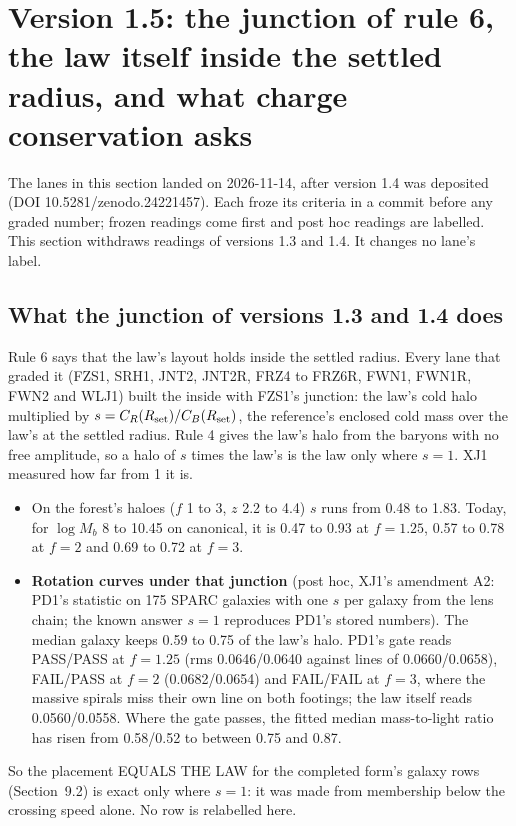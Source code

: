 \documentclass[10pt]{article}
\begin{document}
\section{Version 1.5: the junction of rule 6, the law itself inside the settled radius, and what charge conservation asks}
The lanes in this section landed on 2026-11-14, after version 1.4 was deposited (DOI 10.5281/zenodo.24221457). Each froze its criteria in a commit before any graded number; frozen readings come first and post hoc readings are labelled. This section withdraws readings of versions 1.3 and 1.4. It changes no lane's label.

\subsection{What the junction of versions 1.3 and 1.4 does}
Rule 6 says that the law's layout holds inside the settled radius. Every lane that graded it (FZS1, SRH1, JNT2, JNT2R, FRZ4 to FRZ6R, FWN1, FWN1R, FWN2 and WLJ1) built the inside with FZS1's junction: the law's cold halo multiplied by $s=C_R(R_{\rm set})/C_B(R_{\rm set})$, the reference's enclosed cold mass over the law's at the settled radius. Rule 4 gives the law's halo from the baryons with no free amplitude, so a halo of $s$ times the law's is the law only where $s=1$. XJ1 measured how far from 1 it is.
\begin{itemize}
\item On the forest's haloes ($f$ 1 to 3, $z$ 2.2 to 4.4) $s$ runs from 0.48 to 1.83. Today, for $\log M_b$ 8 to 10.45 on canonical, it is 0.47 to 0.93 at $f=1.25$, 0.57 to 0.78 at $f=2$ and 0.69 to 0.72 at $f=3$.
\item \textbf{Rotation curves under that junction} (post hoc, XJ1's amendment A2: PD1's statistic on 175 SPARC galaxies with one $s$ per galaxy from the lens chain; the known answer $s=1$ reproduces PD1's stored numbers). The median galaxy keeps 0.59 to 0.75 of the law's halo. PD1's gate reads PASS/PASS at $f=1.25$ (rms 0.0646/0.0640 against lines of 0.0660/0.0658), FAIL/PASS at $f=2$ (0.0682/0.0654) and FAIL/FAIL at $f=3$, where the massive spirals miss their own line on both footings; the law itself reads 0.0560/0.0558. Where the gate passes, the fitted median mass-to-light ratio has risen from 0.58/0.52 to between 0.75 and 0.87.
\end{itemize}
So the placement EQUALS THE LAW for the completed form's galaxy rows (Section~9.2) is exact only where $s=1$: it was made from membership below the crossing speed alone. No row is relabelled here.
\end{document}
